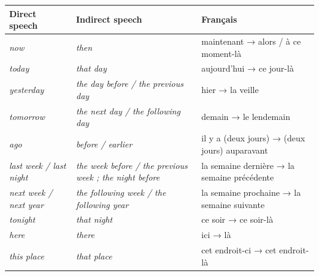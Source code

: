 \documentclass[11pt]{article}
\newcommand{\eng}[1]{\ifmmode\text{\textit{#1}}\else\begingroup\selectlanguage{english}\itshape #1\endgroup\fi}
\begin{document}
\begin{center}
\begin{tabularx}{\linewidth}{|X|X|X|}
\hline
\rowcolor{popblueL} \textbf{Direct speech} & \textbf{Indirect speech} & \textbf{Français} \\
\hline
\eng{now} & \eng{then} & maintenant → alors / à ce moment-là \\
\hline
\eng{today} & \eng{that day} & aujourd'hui → ce jour-là \\
\hline
\eng{yesterday} & \eng{the day before / the previous day} & hier → la veille \\
\hline
\eng{tomorrow} & \eng{the next day / the following day} & demain → le lendemain \\
\hline
\eng{ago} & \eng{before / earlier} & il y a (deux jours) → (deux jours) auparavant \\
\hline
\eng{last week / last night} & \eng{the week before / the previous week ; the night before} & la semaine dernière → la semaine précédente \\
\hline
\eng{next week / next year} & \eng{the following week / the following year} & la semaine prochaine → la semaine suivante \\
\hline
\eng{tonight} & \eng{that night} & ce soir → ce soir-là \\
\hline
\eng{here} & \eng{there} & ici → là \\
\hline
\eng{this place} & \eng{that place} & cet endroit-ci → cet endroit-là \\
\hline
\end{tabularx}
\end{center}
\end{document}
